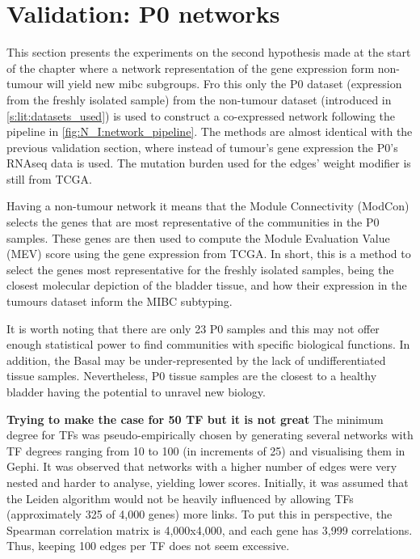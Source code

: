 \section{Validation: P0 networks} \label{s:p0}

This section presents the experiments on the second hypothesis made at the start of the chapter where a network representation of the gene expression form non-tumour will yield new \acrlong{mibc} subgroups. Fro this only the P0 dataset (expression from the freshly isolated sample) from the non-tumour dataset (introduced in \cref{s:lit:datasets_used}) is used to construct a co-expressed network following the pipeline in \cref{fig:N_I:network_pipeline}. The methods are almost identical with the previous validation section, where instead of tumour's gene expression the P0's RNAseq data is used. The mutation burden used for the edges' weight modifier is still from TCGA. 

Having a non-tumour network it means that the Module Connectivity (ModCon) selects the genes that are most representative of the communities in the P0 samples. These genes are then used to compute the Module Evaluation Value (MEV) score using the gene expression from TCGA. In short, this is a method to select the genes most representative for the freshly isolated samples, being the closest molecular depiction of the bladder tissue, and how their expression in the tumours dataset inform the MIBC subtyping.

It is worth noting that there are only 23 P0 samples and this may not offer enough statistical power to find communities with specific biological functions. In addition, the Basal may be under-represented by the lack of undifferentiated tissue samples. Nevertheless, P0 tissue samples are the closest to a healthy bladder having the potential to unravel new biology.

\textbf{Trying to make the case for 50 TF but it is not great}
The minimum degree for TFs was pseudo-empirically chosen by generating several networks with TF degrees ranging from 10 to 100 (in increments of 25) and visualising them in Gephi. It was observed that networks with a higher number of edges were very nested and harder to analyse, yielding lower scores. Initially, it was assumed that the Leiden algorithm would not be heavily influenced by allowing TFs (approximately 325 of 4,000 genes) more links. To put this in perspective, the Spearman correlation matrix is 4,000x4,000, and each gene has 3,999 correlations. Thus, keeping 100 edges per TF does not seem excessive.

